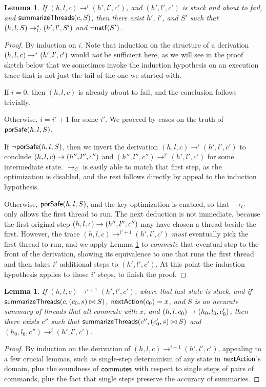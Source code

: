 \documentclass{amsbook}
\newtheorem{lemma}[theorem]{Lemma}
\theoremstyle{definition}
\theoremstyle{remark}
\numberwithin{section}{chapter}
\numberwithin{equation}{chapter}
\begin{document}
\begin{lemma}\label{translate_trace}
  If $(h, l, c) \to^i (h', l', c')$, and $(h', l', c')$ is stuck and about to fail, and $\mathsf{summarizeThreads}(c, S)$, then there exist $h'$, $l'$, and $S'$ such that $(h, l, S) \to_C^* (h', l', S')$ and $\neg \mathsf{natf}(S')$.
\end{lemma}
\begin{proof}
  By induction on $i$.
  Note that induction on the structure of a derivation $(h, l, c) \to^* (h', l', c')$ would \emph{not} be sufficient here, as we will see in the proof sketch below that we sometimes invoke the induction hypothesis on an execution trace that is not just the tail of the one we started with.

  If $i = 0$, then $(h, l, c)$ is already about to fail, and the conclusion follows trivially.

  Otherwise, $i = i' + 1$ for some $i'$.
  We proceed by cases on the truth of $\mathsf{porSafe}(h, l, S)$.

  If $\neg \mathsf{porSafe}(h, l, S)$, then we invert the derivation $(h, l, c) \to^i (h', l', c')$ to conclude $(h, l, c) \to (h'', l'', c'')$ and $(h'', l'', c'') \to^{i'} (h', l', c')$ for some intermediate state.
  $\to_C$ is easily able to match that first step, as the optimization is disabled, and the rest follows directly by appeal to the induction hypothesis.

  Otherwise, $\mathsf{porSafe}(h, l, S)$, and the key optimization is enabled, so that $\to_C$ only allows the first thread to run.
  The next deduction is not immediate, because the first original step $(h, l, c) \to (h'', l'', c'')$ may have chosen a thread beside the first.
  However, the trace $(h, l, c) \to^{i'+1} (h', l', c')$ \emph{must} eventually pick the first thread to run, and we apply Lemma \ref{translate_trace_commute} to \emph{commute} that eventual step to the front of the derivation, showing its equivalence to one that runs the first thread and then takes $i'$ additional steps to $(h', l', c')$.
  At this point the induction hypothesis applies to those $i'$ steps, to finish the proof.
\end{proof}

\begin{lemma}\label{translate_trace_commute}
  If $(h, l, c) \to^{i+1} (h', l', c')$, where that last state is stuck, and if $\mathsf{summarizeThreads}(c, (c_0, s) \bowtie S)$, $\mathsf{nextAction}(c_0) = x$, and $S$ is an accurate summary of threads that all commute with $x$, and $(h, l, c_0) \to (h_0, l_0, c'_0)$, then there exists $c''$ such that $\mathsf{summarizeThreads}(c'', (c'_0, s) \bowtie S)$ and $(h_0, l_0, c'') \to^i (h', l', c')$.
\end{lemma}
\begin{proof}
  By induction on the derivation of $(h, l, c) \to^{i+1} (h', l', c')$, appealing to a few crucial lemmas, such as single-step determinism of any state in $\mathsf{nextAction}$'s domain, plus the soundness of $\mathsf{commutes}$ with respect to single steps of pairs of commands, plus the fact that single steps preserve the accuracy of summaries.
\end{proof}
\end{document}
